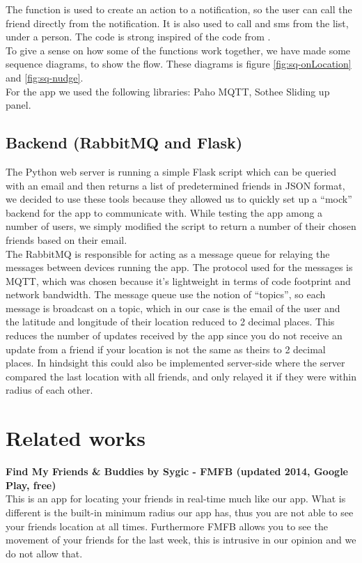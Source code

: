 \documentclass[runningheads,a4paper]{llncs}
\begin{document}
The function is used to create an action to a notification, so the user can call the friend directly from the notification. It is also used to call and sms from the list, under a person. 
The code is strong inspired of the code from \cite{number}.\\


To give a sense on how some of the functions work together, we have made some sequence diagrams, to show the flow. These diagrams is figure \ref{fig:sq-onLocation} and \ref{fig:sq-nudge}.\\ 

For the app we used the following libraries: Paho MQTT\cite{paho}, Sothee Sliding up panel\cite{slidinguppanel}.


\subsection{Backend (RabbitMQ and Flask)}
The Python web server is running a simple Flask\cite{flask} script which can be queried with an email and then returns a list of predetermined friends in JSON format, we decided to use these tools because they allowed us to quickly set up a “mock” backend for the app to communicate with. While testing the app among a number of users, we simply modified the script to return a number of their chosen friends based on their email.\\

The RabbitMQ is responsible for acting as a message queue for relaying the messages between devices running the app. The protocol used for the messages is MQTT, which was chosen because it’s lightweight in terms of code footprint and network bandwidth. The message queue use the notion of “topics”, so each message is broadcast on a topic, which in our case is the email of the user and the latitude and longitude of their location reduced to 2 decimal places. This reduces the number of updates received by the app since you do not receive an update from a friend if your location is not the same as theirs to 2 decimal places. In hindsight this could also be implemented server-side where the server compared the last location with all friends, and only relayed it if they were within radius of each other.

 
\section{Related works}
\textbf{Find My Friends \& Buddies by Sygic - FMFB (updated 2014, Google Play, free)}\\
This is an app for locating your friends in real-time much like our app. What is different is the built-in minimum radius our app has, thus you are not able to see your friends location at all times. Furthermore FMFB allows you to see the movement of your friends for the last week, this is intrusive in our opinion and we do not allow that.\\
\end{document}
